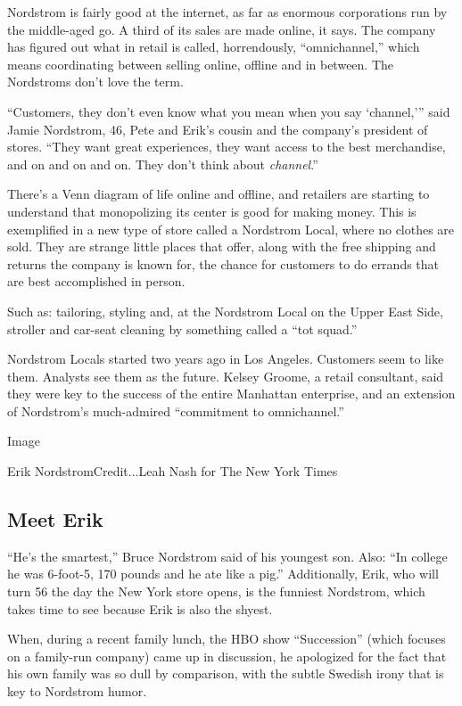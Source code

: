 Nordstrom is fairly good at the internet, as far as enormous
corporations run by the middle-aged go. A third of its sales are made
online, it says. The company has figured out what in retail is called,
horrendously, ``omnichannel,'' which means coordinating between selling
online, offline and in between. The Nordstroms don't love the term.

``Customers, they don't even know what you mean when you say
`channel,''' said Jamie Nordstrom, 46, Pete and Erik's cousin and the
company's president of stores. ``They want great experiences, they want
access to the best merchandise, and on and on and on. They don't think
about \emph{channel}.''

There's a Venn diagram of life online and offline, and retailers are
starting to understand that monopolizing its center is good for making
money. This is exemplified in a new type of store called a Nordstrom
Local, where no clothes are sold. They are strange little places that
offer, along with the free shipping and returns the company is known
for, the chance for customers to do errands that are best accomplished
in person.

Such as: tailoring, styling and, at the Nordstrom Local on the Upper
East Side, stroller and car-seat cleaning by something called a ``tot
squad.''

Nordstrom Locals started two years ago in Los Angeles. Customers seem to
like them. Analysts see them as the future. Kelsey Groome, a retail
consultant, said they were key to the success of the entire Manhattan
enterprise, and an extension of Nordstrom's much-admired ``commitment to
omnichannel.''

Image

Erik NordstromCredit...Leah Nash for The New York Times

\hypertarget{meet-erik}{%
\subsection{Meet Erik}\label{meet-erik}}

``He's the smartest,'' Bruce Nordstrom said of his youngest son. Also:
``In college he was 6-foot-5, 170 pounds and he ate like a pig.''
Additionally, Erik, who will turn 56 the day the New York store opens,
is the funniest Nordstrom, which takes time to see because Erik is also
the shyest.

When, during a recent family lunch, the HBO show ``Succession'' (which
focuses on a family-run company) came up in discussion, he apologized
for the fact that his own family was so dull by comparison, with the
subtle Swedish irony that is key to Nordstrom humor.

